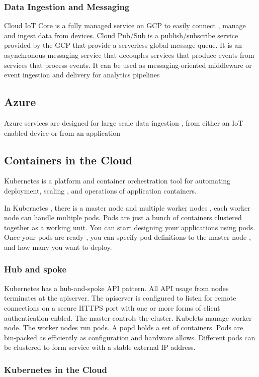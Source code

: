 \documentclass{article}
\begin{document}
\subsubsection{Data Ingestion and Messaging}
Cloud IoT Core is a fully managed service on GCP to easily connect , manage and ingest data from devices.
Cloud Pub/Sub is a publish/subscribe service provided by the GCP that provide a serverless global message queue. It is an asynchronous messaging service that decouples services that produce events from services that process events.
It can be used as messaging-oriented middleware or event ingestion and delivery for analytics pipelines

\subsection{Azure}
Azure services are designed for large scale data ingestion , from either an IoT enabled device or from an application

\subsection{Containers in the Cloud}
Kubernetes is a platform and container orchestration tool for automating deployment, scaling , and operations of application containers.

In Kubernetes , there is a master node and multiple worker nodes , each worker node can handle multiple pods.
Pods are just a bunch of containers clustered together as a working unit. 
You can start designing your applications using pods.
Once your pods are ready , you can specify pod definitions to the master node , and how many you want to deploy.


\subsubsection{Hub and spoke}
Kubernetes has a hub-and-spoke API pattern.
All API usage from nodes terminates at the apiserver.
The apiserver is configured to listen for remote connections on a secure HTTPS port with one or more forms of client authentication enbled.
The master controls the cluster. Kubelets manage worker node. The worker nodes run pods. A popd holds a set of containers. Pods are bin-packed as efficiently as configuration and hardware allows.
Different pods can be clustered to form service with a stable external IP address.

\subsubsection{Kubernetes in the Cloud}
\end{document}
